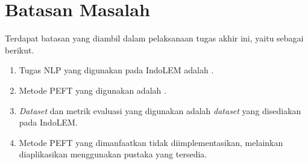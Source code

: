 \section{Batasan Masalah}
\label{sec:batasan-masalah}

Terdapat batasan yang diambil dalam pelaksanaan tugas akhir ini, yaitu sebagai berikut.

\begin{enumerate}
    \item Tugas NLP yang digunakan pada IndoLEM adalah \nlptask.
    \item Metode PEFT yang digunakan adalah \methodPEFT.
    \item \textit{Dataset} dan metrik evaluasi yang digunakan adalah \textit{dataset} yang disediakan pada IndoLEM.
    \item Metode PEFT yang dimanfaatkan tidak diimplementasikan, melainkan diaplikasikan menggunakan pustaka yang tersedia.
\end{enumerate}
